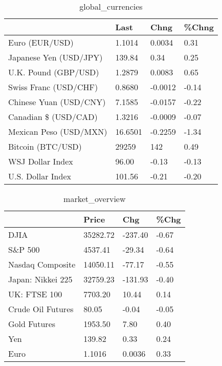 \documentclass{article}%
\begin{document}
%


\begin{table}[htbp]%
\caption{global\_currencies}%
\centering%
\begin{adjustbox}{width=1\textwidth}%
\begin{tabular}{llll}
\toprule
                       &    Last &    Chng & \%Chng \\
\midrule
        Euro (EUR/USD) &  1.1014 &  0.0034 &  0.31 \\
Japanese Yen (USD/JPY) &  139.84 &    0.34 &  0.25 \\
  U.K. Pound (GBP/USD) &  1.2879 &  0.0083 &  0.65 \\
 Swiss Franc (USD/CHF) &  0.8680 & -0.0012 & -0.14 \\
Chinese Yuan (USD/CNY) &  7.1585 & -0.0157 & -0.22 \\
  Canadian \$ (USD/CAD) &  1.3216 & -0.0009 & -0.07 \\
Mexican Peso (USD/MXN) & 16.6501 & -0.2259 & -1.34 \\
     Bitcoin (BTC/USD) &   29259 &     142 &  0.49 \\
      WSJ Dollar Index &   96.00 &   -0.13 & -0.13 \\
     U.S. Dollar Index &  101.56 &   -0.21 & -0.20 \\
\bottomrule
\end{tabular}
%
\end{adjustbox}%
\end{table}

%


\begin{table}[htbp]%
\caption{market\_overview}%
\centering%
\begin{adjustbox}{width=1\textwidth}%
\begin{tabular}{llll}
\toprule
                  &    Price &     Chg &  \%Chg \\
\midrule
             DJIA & 35282.72 & -237.40 & -0.67 \\
          S\&P 500 &  4537.41 &  -29.34 & -0.64 \\
 Nasdaq Composite & 14050.11 &  -77.17 & -0.55 \\
Japan: Nikkei 225 & 32759.23 & -131.93 & -0.40 \\
     UK: FTSE 100 &  7703.20 &   10.44 &  0.14 \\
Crude Oil Futures &    80.05 &   -0.04 & -0.05 \\
     Gold Futures &  1953.50 &    7.80 &  0.40 \\
              Yen &   139.82 &    0.33 &  0.24 \\
             Euro &   1.1016 &  0.0036 &  0.33 \\
\bottomrule
\end{tabular}
%
\end{adjustbox}%
\end{table}

%
\end{document}
